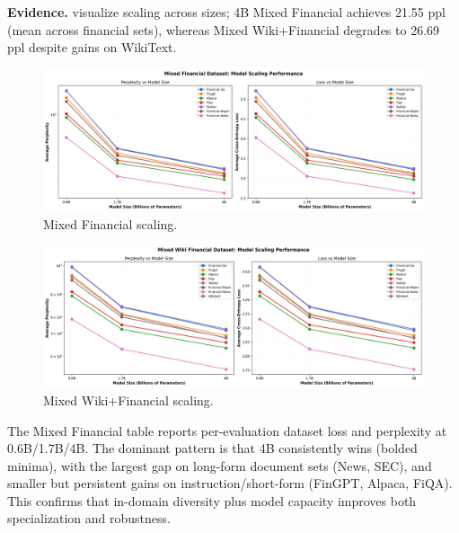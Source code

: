 \textbf{Evidence.}  visualize scaling across sizes; 4B Mixed Financial achieves 21.55 ppl (mean across financial sets), whereas Mixed Wiki+Financial degrades to 26.69 ppl despite gains on WikiText.

\begin{figure}[H]
  \centering
  \includegraphics[width=\textwidth]{../thesis/figures/scaling_mixed_financial.png}
  \caption{Mixed Financial scaling.}\label{fig:scaling_mixed_financial}
\end{figure}

\begin{figure}[H]
  \centering
  \includegraphics[width=\textwidth]{../thesis/figures/scaling_mixed_wiki_financial.png}
  \caption{Mixed Wiki+Financial scaling.}\label{fig:scaling_mixed_wiki_financial}
\end{figure}

{\tighttable
}

The Mixed Financial table reports per-evaluation dataset loss and perplexity at 0.6B/1.7B/4B. The dominant pattern is that 4B consistently wins (bolded minima), with the largest gap on long-form document sets (News, SEC), and smaller but persistent gains on instruction/short-form (FinGPT, Alpaca, FiQA). This confirms that in-domain diversity plus model capacity improves both specialization and robustness.

{\tighttable
}

